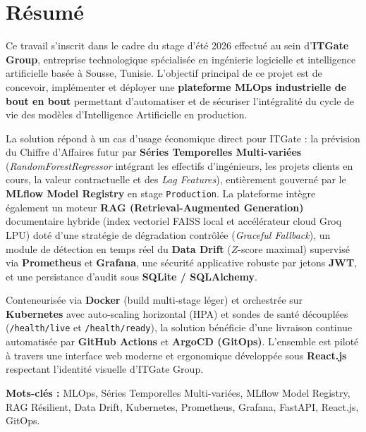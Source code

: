 \documentclass[11pt,a4paper,oneside]{report}
\begin{document}
\newpage

\section*{Résumé}

Ce travail s'inscrit dans le cadre du stage d'été 2026 effectué au sein d'\textbf{ITGate Group}, entreprise technologique spécialisée en ingénierie logicielle et intelligence artificielle basée à Sousse, Tunisie. L'objectif principal de ce projet est de concevoir, implémenter et déployer une \textbf{plateforme MLOps industrielle de bout en bout} permettant d'automatiser et de sécuriser l'intégralité du cycle de vie des modèles d'Intelligence Artificielle en production.

La solution répond à un cas d'usage économique direct pour ITGate : la prévision du Chiffre d'Affaires futur par \textbf{Séries Temporelles Multi-variées} (\textit{RandomForestRegressor} intégrant les effectifs d'ingénieurs, les projets clients en cours, la valeur contractuelle et des \textit{Lag Features}), entièrement gouverné par le \textbf{MLflow Model Registry} en stage \texttt{Production}. La plateforme intègre également un moteur \textbf{RAG (Retrieval-Augmented Generation)} documentaire hybride (index vectoriel FAISS local et accélérateur cloud Groq LPU) doté d'une stratégie de dégradation contrôlée (\textit{Graceful Fallback}), un module de détection en temps réel du \textbf{Data Drift} ($Z$-score maximal) supervisé via \textbf{Prometheus} et \textbf{Grafana}, une sécurité applicative robuste par jetons \textbf{JWT}, et une persistance d'audit sous \textbf{SQLite / SQLAlchemy}.

Conteneurisée via \textbf{Docker} (build multi-stage léger) et orchestrée sur \textbf{Kubernetes} avec auto-scaling horizontal (HPA) et sondes de santé découplées (\texttt{/health/live} et \texttt{/health/ready}), la solution bénéficie d'une livraison continue automatisée par \textbf{GitHub Actions} et \textbf{ArgoCD (GitOps)}. L'ensemble est piloté à travers une interface web moderne et ergonomique développée sous \textbf{React.js} respectant l'identité visuelle d'ITGate Group.

\vspace{0.25cm}
\textbf{Mots-clés :} MLOps, Séries Temporelles Multi-variées, MLflow Model Registry, RAG Résilient, Data Drift, Kubernetes, Prometheus, Grafana, FastAPI, React.js, GitOps.
\end{document}
